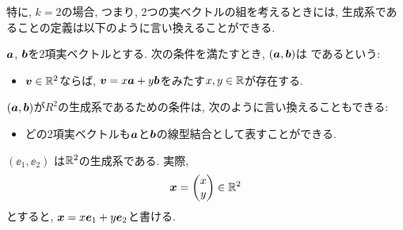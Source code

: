 特に, $k=2$の場合, つまり, 2つの実ベクトルの組を考えるときには,
生成系であることの定義は以下のように言い換えることができる.
\begin{definition}
  $\boldsymbol{a}$, $\boldsymbol{b}$を$2$項実ベクトルとする.
  次の条件を満たすとき,
  $(\boldsymbol{a},\boldsymbol{b})$は
  であるという:
  \begin{itemize}
  \item
    $\boldsymbol{v}\in\mathbb{R}^2$ならば,
    $\boldsymbol{v}=x\boldsymbol{a}+y\boldsymbol{b}$をみたす$x,y\in\mathbb{R}$が存在する.
  \end{itemize}
\end{definition}
\begin{remark}
  $(\boldsymbol{a},\boldsymbol{b})$が$R^2$の生成系であるための条件は,
  次のように言い換えることもできる:
  \begin{itemize}
  \item
    どの2項実ベクトルも$\boldsymbol{a}$と$\boldsymbol{b}$の線型結合として表すことができる.
  \end{itemize}
\end{remark}
\begin{example}
  \label{ex:gens:std}
  $(\ee_1,\ee_2)$ は$\mathbb{R}^2$の生成系である.
  実際,
  \begin{align*}
    \boldsymbol{x}=
   \begin{pmatrix}
      x\\y
    \end{pmatrix}\in\mathbb{R}^2
  \end{align*}
  とすると,  $\boldsymbol{x}=x\boldsymbol{e}_1+y\boldsymbol{e}_2$と書ける.
\end{example}

